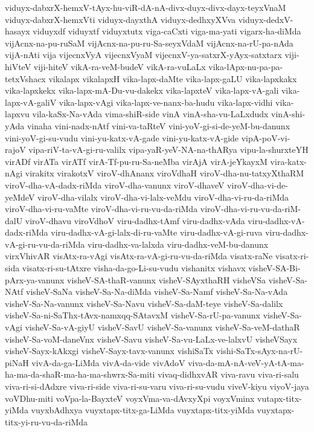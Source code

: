{viduyx-dabxrX-hemxV-tAyx-hu-viR-dA-nA-divx-duyx-divx-dayx-teyxVnaM
viduyx-dabxrX-hemxVti
viduyx-dayxthA
viduyx-dedhxyXVva
viduyx-dedxV-hasayx
viduyxdf
viduyxtf
viduyxtutx
viga-caCxti
viga-ma-yati
vigarx-ha-diMda
vijAcnx-na-pu-ruSaM
vijAcnx-na-pu-ru-Sa-seyxVdaM
vijAcnx-na-rU-pa-nAda
vijA-nAti
vija
vijecnxVyA
vijecnxVyaM
vijecnxV-ya-satxrX-yAyx-satxtarx
viji-hiVteV
viji-hiteV
vikA-ra-veM-budeV
vikA-ra-vuLaLx
vika-lApx-nu-pa-pa-tetxVshacx
vikalapx
vikalapxH
vika-lapx-daMte
vika-lapx-gaLU
vika-lapxkakx
vika-lapxkekx
vika-lapx-mA-Du-vu-dakekx
vika-lapxteV
vika-lapx-vA-gali
vika-lapx-vA-galiV
vika-lapx-vAgi
vika-lapx-ve-nanx-ba-hudu
vika-lapx-vidhi
vika-lapxvu
vila-kaSx-Na-vAda
vima-shiR-side
vinA
vinA-sha-vu-LaLxdudx
vinA-shi-yAda
vinaha
vini-nadx-nAtf
vini-va-taRteV
vini-yoV-gi-si-de-yeM-bu-danunx
vini-yoV-gi-su-vudu
vini-yu-katx-vA-gade
vini-yu-katx-vA-gide
vipA-poV-vi-rajoV
vipa-riV-ta-vA-gi-ru-valilx
vipa-yaR-yeV-NA-na-thARya
vipu-la-shurxteYH
virADf
virATa
virATf
virA-Tf-pu-ru-Sa-neMba
virAjA
virA-jeYkayxM
vira-katx-nAgi
virakitx
virakotxV
viroV-dhAnanx
viroVdhaH
viroV-dha-nu-tatxyXthaRM
viroV-dha-vA-dadx-riMda
viroV-dha-vanunx
viroV-dhaveV
viroV-dha-vi-de-yeMdeV
viroV-dha-vilalx
viroV-dha-vi-lalx-veMdu
viroV-dha-vi-ru-da-riMda
viroV-dha-vi-ru-vaMte
viroV-dha-vi-ru-vu-da-riMda
viroV-dha-vi-ru-vu-da-riM-dalU
viroV-dhavu
viroVdhoV
viru-dadhx-tAmf
viru-dadhx-vAda
viru-dadhx-vA-dadx-riMda
viru-dadhx-vA-gi-lalx-di-ru-vaMte
viru-dadhx-vA-gi-ruva
viru-dadhx-vA-gi-ru-vu-da-riMda
viru-dadhx-va-lalxda
viru-dadhx-veM-bu-danunx
virxVhivAR
visAtx-ra-vAgi
visAtx-ra-vA-gi-ru-vu-da-riMda
visatx-raNe
visatx-ri-sida
visatx-ri-su-tAtxre
visha-da-go-Li-su-vudu
vishanitx
vishavx
visheV-SA-Bi-pArx-ya-vanunx
visheV-SA-thaR-vanunx
visheV-SAyxthaRH
visheVSa
visheV-Sa-NAtf
visheV-SaNa
visheV-Sa-Na-diMda
visheV-Sa-Namf
visheV-Sa-Na-vAda
visheV-Sa-Na-vanunx
visheV-Sa-Navu
visheV-Sa-daM-teye
visheV-Sa-dalilx
visheV-Sa-ni-SaThx-tAvx-namxqq-SAtavxM
visheV-Sa-rU-pa-vanunx
visheV-Sa-vAgi
visheV-Sa-vA-giyU
visheV-SavU
visheV-Sa-vanunx
visheV-Sa-veM-dathaR
visheV-Sa-voM-daneVnx
visheV-Savu
visheV-Sa-vu-LaLx-ve-lalxvU
visheVSayx
visheV-Sayx-kAkxgi
visheV-Sayx-tavx-vanunx
vishiSaTx
vishi-SaTx-sAyx-na-rU-piNaH
vivA-da-ga-LiMda
vivA-da-vide
vivAdoV
viva-da-mA-nA-veV-yA-tA-ma-ha-ma-da-shaR-ma-ha-ma-shwrx-Sa-miti
vivaq-didhxvAR
viva-ravu
viva-ri-salu
viva-ri-si-dAdxre
viva-ri-side
viva-ri-su-varu
viva-ri-su-vudu
viveV-kiyu
viyoV-jaya
voVDhu-miti
voVpa-la-BayxteV
voyxVma-va-dAvxyXpi
voyxVminx
vutapx-titx-yiMda
vuyxbAdhxya
vuyxtapx-titx-ga-LiMda
vuyxtapx-titx-yiMda
vuyxtapx-titx-yi-ru-vu-da-riMda
}
